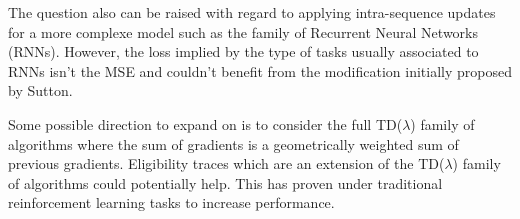 \documentclass{article}
\begin{document}
The question also can be raised with regard to applying intra-sequence updates for a more complexe model such as the family of Recurrent Neural Networks (RNNs). However, the loss implied by the type of tasks usually associated to RNNs isn't the MSE and couldn't benefit from the modification initially proposed by Sutton.

Some possible direction to expand on is to consider the full TD($\lambda$) family of algorithms where the sum of gradients is a geometrically weighted sum of previous gradients. Eligibility traces which are an extension of the TD($\lambda$) family of algorithms could potentially help. This has proven under traditional reinforcement learning tasks to increase performance.



\end{document}
